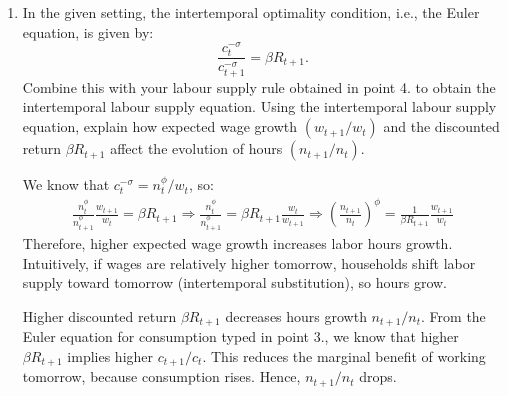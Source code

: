 \documentclass[dvipsnames,11pt]{article}
\begin{document}
\begin{enumerate}
\begin{solution}
        The marginal utility of consumption is:
        \[
        u_c(c_t,n_t)=\lambda_t=c_t^{-\sigma}
        \]
        which depends only on $c_t$. Hence, holding fixed $\lambda_t$ is equivalent to holding fixed $c_t$. Then, recall the Euler equation we derived in point 4:
        \[
        c_t^{-\sigma}=\frac{n_t^\phi}{w_t}.
        \]
        Taking logs:
        \[
        -\sigma \log c_t=\phi \log n_t-\log w_t.
        \]
        Now, total differentiate with respect to $\log w_t$ holding $c_t$ fixed:
        \[
        0=\phi \frac{d \log n_t}{d \log w_t}-1,
        \]
        and so:
        \[
        \frac{d \log n_t}{d \log w_t}= \varepsilon_t^F=\frac{1}{\phi}.
        \]
        \end{solution}

        \item In the given setting, the intertemporal optimality condition, i.e., the Euler equation, is given by: 
        \[
        \frac{c_t^{-\sigma}}{c_{t+1}^{-\sigma}} = \beta R_{t+1}.
        \]
        Combine this with your labour supply rule obtained in point 4. to obtain the intertemporal labour supply equation. Using the intertemporal labour supply equation, explain how expected wage growth $(w_{t+1}/w_t)$ and the discounted return $\beta R_{t+1}$ affect the evolution of hours $(n_{t+1}/n_t)$.

        \begin{solution}

        We know that $c_t^{-\sigma}=n_t^\phi/w_t$, so:
        \begin{align*}
            \frac{n_t^\phi}{n_{t+1}^\phi} \frac{w_{t+1}}{w_t}= \beta R_{t+1} \Rightarrow \frac{n_t^\phi}{n_{t+1}^\phi}= \beta R_{t+1}\frac{w_t}{w_{t+1}} \Rightarrow \left( \frac{n_{t
            +1}}{n_t}\right)^\phi =\frac{1}{\beta R_{t+1}} \frac{w_{t+1}}{w_t}
        \end{align*}
        Therefore, higher expected wage growth increases labor hours growth. Intuitively, if wages are relatively higher tomorrow, households shift labor supply toward tomorrow (intertemporal substitution), so hours grow. 
        
        Higher discounted return $\beta R_{t+1}$ decreases hours growth $n_{t+1}/n_t$. From the Euler equation for consumption typed in point 3., we know that higher $\beta R_{t+1}$ implies higher $c_{t+1}/c_t$. This reduces the marginal benefit of working tomorrow, because consumption rises. Hence, $n_{t+1}/n_t$ drops. 
            
        \end{solution}
        
    \end{enumerate}
\end{document}
